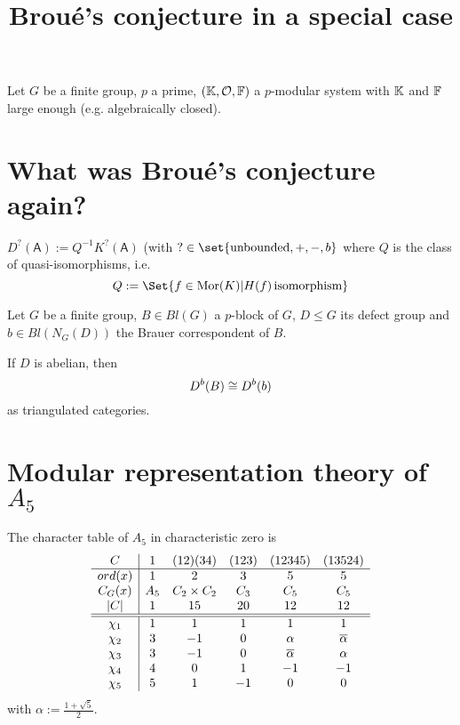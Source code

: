 \documentclass[fontsize=11pt,fleqn,a4paper]{scrartcl}
\title{Broué's conjecture in a special case}
\begin{document}
\maketitle

\begin{convention}
Let $G$ be a finite group, $p$ a prime, $(\mathbb{K},\mathcal{O},\mathbb{F})$ a $p$-modular system with $\mathbb{K}$ and $\mathbb{F}$ large enough (e.g. algebraically closed).
\end{convention}

\section{What was Broué's conjecture again?}

\begin{definition}
$D^?(\mathsf{A}) := Q^{-1} K^?(\mathsf{A})$ (with $?\in\set{\text{unbounded},+,-,b}$ where $Q$ is the class of quasi-isomorphisms, i.e.
\[Q:=\Set{f\in \operatorname{Mor}(K) | H(f) \,\text{isomorphism}}\]
\end{definition}

\begin{conjecture}
Let $G$ be a finite group, $B\in Bl(G)$ a $p$-block of $G$, $D\leq G$ its defect group and $b\in Bl(N_G(D))$ the Brauer correspondent of $B$.

If $D$ is abelian, then
\[D^b(B) \cong D^b(b)\]
as triangulated categories.
\end{conjecture}

\section{Modular representation theory of $A_5$}

\begin{theorem}
The character table of $A_5$ in characteristic zero is
\[\begin{array}{c|ccccc}
C & 1 & (12)(34) & (123) & (12345) & (13524) \\
\hline
ord(x) & 1 & 2 & 3 & 5 & 5 \\
C_G(x) & A_5 & C_2\times C_2 & C_3 & C_5 & C_5 \\
\lvert C\rvert & 1 & 15 & 20 & 12 & 12 \\
\hline\hline
\chi_1 & 1 & 1 & 1 & 1 & 1\\
\chi_2 & 3 & -1 & 0 & \alpha & \overline{\alpha} \\
\chi_3 & 3 & -1 & 0 & \overline{\alpha} & \alpha \\
\chi_4 & 4 & 0 & 1 & -1 & -1 \\
\chi_5 & 5 & 1 & -1 & 0 & 0
\end{array}\]
with $\alpha:=\frac{1+\sqrt{5}}{2}$.
\end{theorem}
\end{document}
